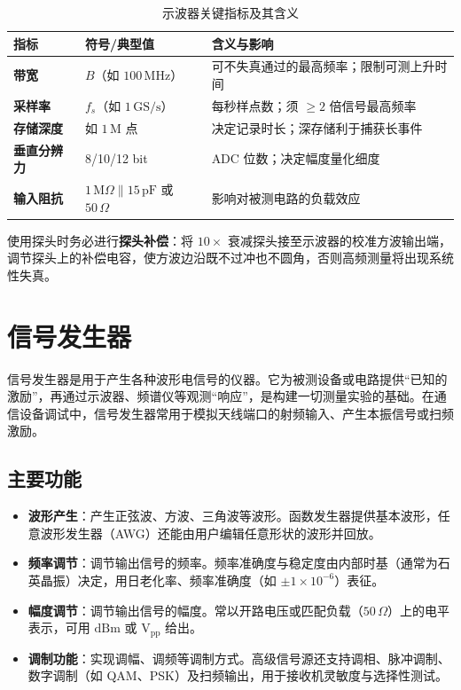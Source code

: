 \begin{table}[htbp]
    \centering
    \caption{示波器关键指标及其含义}
    \begin{tabular}{|p{3.2cm}|p{4.6cm}|p{6.2cm}|}
        \hline
        \textbf{指标} & \textbf{符号/典型值} & \textbf{含义与影响} \\
        \hline
        \textbf{带宽} & $B$（如 $100\,\mathrm{MHz}$） & 可不失真通过的最高频率；限制可测上升时间 \\
        \hline
        \textbf{采样率} & $f_s$（如 $1\,\mathrm{GS/s}$） & 每秒样点数；须 $\ge 2$ 倍信号最高频率 \\
        \hline
        \textbf{存储深度} & 如 $1\,\mathrm{M}$ 点 & 决定记录时长；深存储利于捕获长事件 \\
        \hline
        \textbf{垂直分辨力} & 8/10/12 bit & ADC 位数；决定幅度量化细度 \\
        \hline
        \textbf{输入阻抗} & $1\,\mathrm{M}\Omega\parallel\!15\,\mathrm{pF}$ 或 $50\,\Omega$ & 影响对被测电路的负载效应 \\
        \hline
    \end{tabular}
\end{table}

使用探头时务必进行\textbf{探头补偿}：将 $10\times$ 衰减探头接至示波器的校准方波输出端，调节探头上的补偿电容，使方波边沿既不过冲也不圆角，否则高频测量将出现系统性失真。

\section{信号发生器}
\label{sec:signal_generator}

信号发生器是用于产生各种波形电信号的仪器。它为被测设备或电路提供“已知的激励”，再通过示波器、频谱仪等观测“响应”，是构建一切测量实验的基础。在通信设备调试中，信号发生器常用于模拟天线端口的射频输入、产生本振信号或扫频激励。

\subsection{主要功能}

\begin{itemize}
    \item \textbf{波形产生}：产生正弦波、方波、三角波等波形。函数发生器提供基本波形，任意波形发生器（AWG）还能由用户编辑任意形状的波形并回放。
    \item \textbf{频率调节}：调节输出信号的频率。频率准确度与稳定度由内部时基（通常为石英晶振）决定，用日老化率、频率准确度（如 $\pm 1\times10^{-6}$）表征。
    \item \textbf{幅度调节}：调节输出信号的幅度。常以开路电压或匹配负载（$50\,\Omega$）上的电平表示，可用 $\mathrm{dBm}$ 或 $\mathrm{V_{pp}}$ 给出。
    \item \textbf{调制功能}：实现调幅、调频等调制方式。高级信号源还支持调相、脉冲调制、数字调制（如 QAM、PSK）及扫频输出，用于接收机灵敏度与选择性测试。
\end{itemize}

